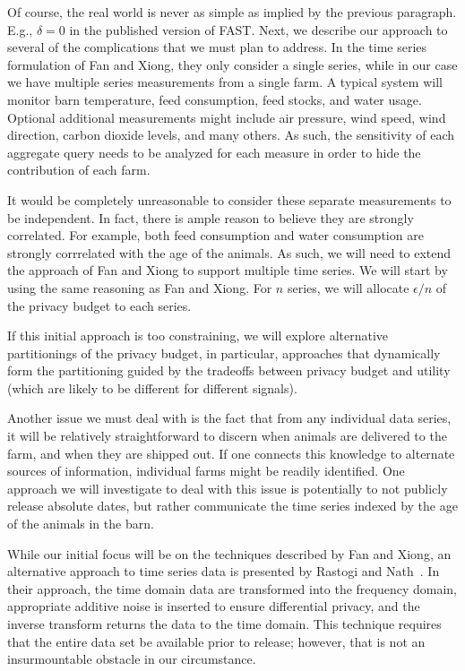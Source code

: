 Of course, the real world is never as simple as implied by the previous
paragraph.  E.g., $\delta= 0$ in the published version of FAST.
Next, we describe our approach to several of the
complications that we must plan to address.
In the time series formulation of Fan and Xiong, they only consider
a single series, while in our case we have multiple series measurements
from a single farm.  A typical system will monitor barn temperature,
feed consumption, feed stocks, and water usage.
Optional additional measurements might include
air pressure, wind speed, wind direction, carbon dioxide levels,
and many others.
As such,
the sensitivity of each aggregate query needs to be analyzed
for each measure in order to hide the contribution of each farm.

It would be completely unreasonable to consider these separate measurements
to be independent.  In fact, there is ample reason to believe they are
strongly correlated.
For example, both feed consumption and water consumption are strongly
corrrelated with the age of the animals.
As such, we will need to extend the approach of Fan and Xiong to support
multiple time series.
We will start by using the same reasoning as Fan and Xiong.  For $n$
series, we will allocate $\epsilon / n$ of the privacy budget to each series.

If this initial approach is too constraining, we will explore alternative
partitionings of the privacy budget, in particular, approaches that dynamically
form the partitioning guided by the tradeoffs between privacy budget
and utility (which are likely to be different for different signals).

Another issue we must deal with is the fact that from any individual
data series, it will be relatively straightforward to discern when animals
are delivered to the farm, and when they are shipped out.
If one connects this knowledge
to alternate sources of information, individual farms might be
readily identified.  One approach we will investigate to deal with this
issue is potentially to not publicly release absolute dates, but rather
communicate the time series indexed by the age of the animals in the barn.

While our initial focus will be on the techniques described by Fan and Xiong,
an alternative approach to time series data is presented by Rastogi
and Nath~\cite{rn10}.  In their approach, the time domain data are
transformed into the frequency domain, appropriate additive noise
is inserted to ensure differential privacy, and the inverse transform
returns the data to the time domain.
This technique requires that the entire data set be available prior to
release; however, that is not an insurmountable obstacle in our
circumstance.

